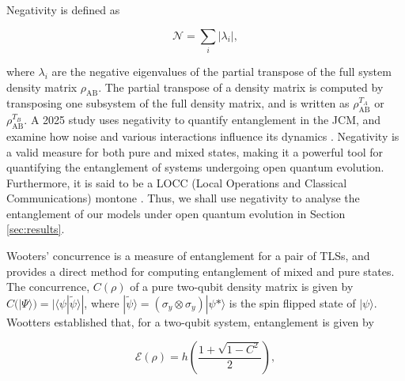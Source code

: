 \documentclass[11pt]{article}
\newcounter{subsubsubsection}[subsubsection]
\begin{document}

Negativity is defined as

\begin{equation} \label{neg_eqn}
    \mathcal{N} = \sum_i |\lambda_i|,
\end{equation}

where $\lambda_i$ are the negative eigenvalues of the partial transpose of the full system density matrix $\rho_{\scriptscriptstyle \text{AB}}$. The partial transpose of a density matrix is computed by transposing one subsystem of the full density matrix, and is written as $\rho_{\scriptscriptstyle \text{AB}}^{T_A}$ or $\rho_{\scriptscriptstyle \text{AB}}^{T_B}$. A 2025 study uses negativity to quantify entanglement in the JCM, and examine how noise and various interactions influence its dynamics \cite{Entanglement2025-Negativity}. Negativity is a valid measure for both pure and mixed states, making it a powerful tool for quantifying the entanglement of systems undergoing open quantum evolution. Furthermore, it is said to be a LOCC (Local Operations and Classical Communications) montone \cite{Entanglement2009-Definition}. Thus, we shall use negativity to analyse the entanglement of our models under open quantum evolution in Section \ref{sec:results}. 


Wooters' concurrence is a measure of entanglement for a pair of TLSs, and provides a direct method for computing entanglement of mixed and pure states. The concurrence, $C(\rho)$ of a pure two-qubit density matrix is given by $C(|\Psi\rangle) = |\langle\psi|\tilde{\psi}\rangle|$, where $|\tilde{\psi}\rangle = (\sigma_y\otimes\sigma_y)|\psi*\rangle$ is the spin flipped state of $|\psi\rangle$. Wootters established that, for a two-qubit system, entanglement is given by

\begin{equation}
    \mathcal{E}(\rho) = h\left(\frac{1+\sqrt{1-C^2}}{2}\right),
\end{equation} 
\end{document}
